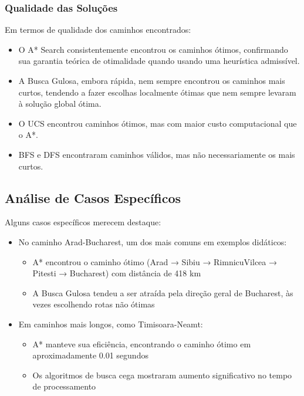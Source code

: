 \documentclass[12pt,a4paper]{article}
\begin{document}
\subsubsection{Qualidade das Soluções}
Em termos de qualidade dos caminhos encontrados:

\begin{itemize}
    \item O A* Search consistentemente encontrou os caminhos ótimos, confirmando sua garantia teórica de otimalidade quando usando uma heurística admissível.
    \item A Busca Gulosa, embora rápida, nem sempre encontrou os caminhos mais curtos, tendendo a fazer escolhas localmente ótimas que nem sempre levaram à solução global ótima.
    \item O UCS encontrou caminhos ótimos, mas com maior custo computacional que o A*.
    \item BFS e DFS encontraram caminhos válidos, mas não necessariamente os mais curtos.
\end{itemize}

\subsection{Análise de Casos Específicos}

Alguns casos específicos merecem destaque:

\begin{itemize}
    \item No caminho Arad-Bucharest, um dos mais comuns em exemplos didáticos:
    \begin{itemize}
        \item A* encontrou o caminho ótimo (Arad → Sibiu → RimnicuVilcea → Pitesti → Bucharest) com distância de 418 km
        \item A Busca Gulosa tendeu a ser atraída pela direção geral de Bucharest, às vezes escolhendo rotas não ótimas
    \end{itemize}
    
    \item Em caminhos mais longos, como Timisoara-Neamt:
    \begin{itemize}
        \item A* manteve sua eficiência, encontrando o caminho ótimo em aproximadamente 0.01 segundos
        \item Os algoritmos de busca cega mostraram aumento significativo no tempo de processamento
    \end{itemize}
\end{itemize}
\end{document}
